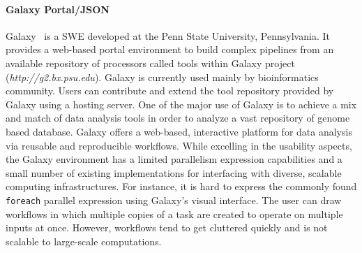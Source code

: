 \paragraph{Galaxy Portal/JSON} Galaxy~\cite{blankenberg-vonkuster-etal:2010} is a
SWE developed at the Penn State University, Pennsylvania. It provides a
web-based portal environment to build complex pipelines from an available
repository of processors called tools within Galaxy project
(\textit{http://g2.bx.psu.edu}).  Galaxy is currently used mainly by
bioinformatics community. Users can contribute and extend the tool repository
provided by Galaxy using a hosting server. One of the major use of Galaxy is to
achieve a mix and match of data analysis tools in order to analyze a vast
repository of genome based database. Galaxy offers a web-based, interactive
platform for data analysis via reusable and reproducible workflows.  While
excelling in the usability aspects, the Galaxy environment has a limited
parallelism expression capabilities and a small number of existing
implementations for interfacing with diverse, scalable computing
infrastructures. For instance, it is hard to express the commonly found
\texttt{foreach} parallel expression using Galaxy's visual interface. The user
can draw workflows in which multiple copies of a task are created to operate on
multiple inputs at once. However, workflows tend to get cluttered quickly and
is not scalable to large-scale computations.
